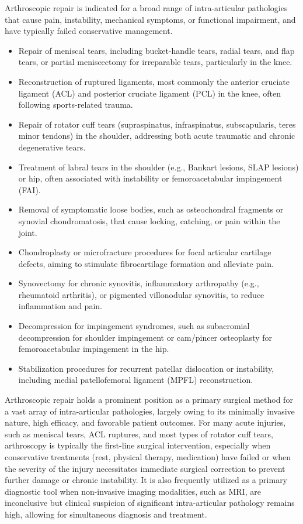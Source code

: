 Arthroscopic repair is indicated for a broad range of intra-articular pathologies that cause pain, instability, mechanical symptoms, or functional impairment, and have typically failed conservative management.

\begin{itemize}
  \item Repair of meniscal tears, including bucket-handle tears, radial tears, and flap tears, or partial meniscectomy for irreparable tears, particularly in the knee.
  \item Reconstruction of ruptured ligaments, most commonly the anterior cruciate ligament (ACL) and posterior cruciate ligament (PCL) in the knee, often following sports-related trauma.
  \item Repair of rotator cuff tears (supraspinatus, infraspinatus, subscapularis, teres minor tendons) in the shoulder, addressing both acute traumatic and chronic degenerative tears.
  \item Treatment of labral tears in the shoulder (e.g., Bankart lesions, SLAP lesions) or hip, often associated with instability or femoroacetabular impingement (FAI).
  \item Removal of symptomatic loose bodies, such as osteochondral fragments or synovial chondromatosis, that cause locking, catching, or pain within the joint.
  \item Chondroplasty or microfracture procedures for focal articular cartilage defects, aiming to stimulate fibrocartilage formation and alleviate pain.
  \item Synovectomy for chronic synovitis, inflammatory arthropathy (e.g., rheumatoid arthritis), or pigmented villonodular synovitis, to reduce inflammation and pain.
  \item Decompression for impingement syndromes, such as subacromial decompression for shoulder impingement or cam/pincer osteoplasty for femoroacetabular impingement in the hip.
  \item Stabilization procedures for recurrent patellar dislocation or instability, including medial patellofemoral ligament (MPFL) reconstruction.
\end{itemize}

Arthroscopic repair holds a prominent position as a primary surgical method for a vast array of intra-articular pathologies, largely owing to its minimally invasive nature, high efficacy, and favorable patient outcomes. For many acute injuries, such as meniscal tears, ACL ruptures, and most types of rotator cuff tears, arthroscopy is typically the first-line surgical intervention, especially when conservative treatments (rest, physical therapy, medication) have failed or when the severity of the injury necessitates immediate surgical correction to prevent further damage or chronic instability. It is also frequently utilized as a primary diagnostic tool when non-invasive imaging modalities, such as MRI, are inconclusive but clinical suspicion of significant intra-articular pathology remains high, allowing for simultaneous diagnosis and treatment.

